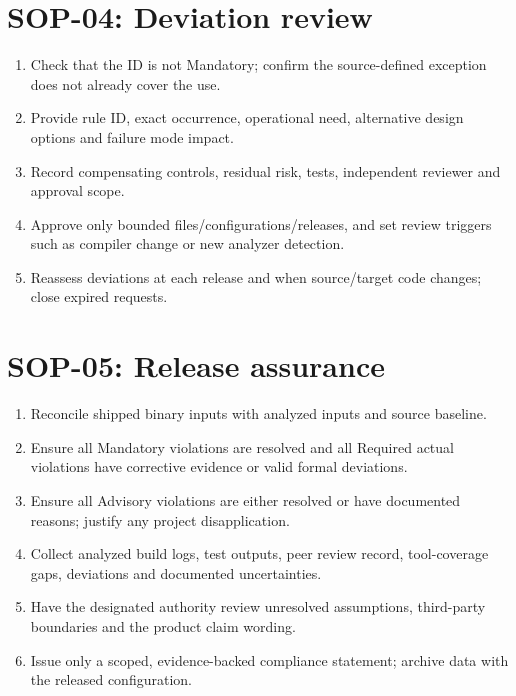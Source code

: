 \documentclass[10pt,letterpaper]{article}
\begin{document}
\section{SOP-04: Deviation review}
\begin{enumerate}
\item Check that the ID is not Mandatory; confirm the source-defined exception does not already cover the use.
\item Provide rule ID, exact occurrence, operational need, alternative design options and failure mode impact.
\item Record compensating controls, residual risk, tests, independent reviewer and approval scope.
\item Approve only bounded files/configurations/releases, and set review triggers such as compiler change or new analyzer detection.
\item Reassess deviations at each release and when source/target code changes; close expired requests.
\end{enumerate}

\section{SOP-05: Release assurance}
\begin{enumerate}
\item Reconcile shipped binary inputs with analyzed inputs and source baseline.
\item Ensure all Mandatory violations are resolved and all Required actual violations have corrective evidence or valid formal deviations.
\item Ensure all Advisory violations are either resolved or have documented reasons; justify any project disapplication.
\item Collect analyzed build logs, test outputs, peer review record, tool-coverage gaps, deviations and documented uncertainties.
\item Have the designated authority review unresolved assumptions, third-party boundaries and the product claim wording.
\item Issue only a scoped, evidence-backed compliance statement; archive data with the released configuration.
\end{enumerate}
\end{document}
